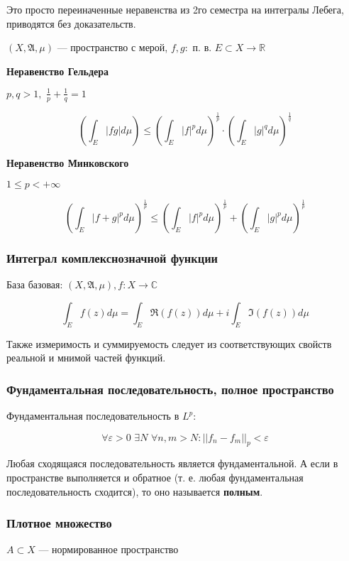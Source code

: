 \documentclass{article}
\def\dbl{\,\,}
\begin{document}
Это просто переиначенные неравенства из 2го семестра на интегралы Лебега, приводятся без доказательств.

$(X, \mathfrak{A}, \mu)$ --- пространство с мерой, $f, g: $ п. в. $E \subset X \rightarrow \mathbb{R}$

\textbf{Неравенство Гельдера}

$p, q > 1, \dbl \frac{1}{p} + \frac{1}{q} = 1$

\[\left(\int_{E} |fg| d\mu \right) \le \left(\int_{E} |f|^p d\mu\right)^{\frac{1}{p}} \cdot \left(\int_{E} |g|^q d\mu\right)^{\frac{1}{q}}\]

\textbf{Неравенство Минковского}

$1 \le p < + \infty$

\[\left(\int_{E} |f + g|^p d\mu \right)^{\frac{1}{p}} \le \left(\int_{E} |f|^p d\mu\right)^{\frac{1}{p}} + \left(\int_{E} |g|^p d\mu\right)^{\frac{1}{p}}\]

\subsubsection{Интеграл комплекснозначной функции}

База базовая: $(X, \mathfrak{A}, \mu), f: X \rightarrow \mathbb{C}$

\[\int_{E}f(z)d\mu = \int_{E}\Re(f(z))d\mu + i\int_{E}\Im(f(z))d\mu\]

Также измеримость и суммируемость следует из соответствующих свойств реальной и мнимой частей функций.

\subsubsection{Фундаментальная последовательность, полное пространство}

Фундаментальная последовательность в $L^p$:

\[\forall \varepsilon > 0 \dbl \exists N \dbl \forall n, m > N: ||f_n - f_m||_p < \varepsilon\]

Любая сходящаяся последовательность является фундаментальной. А если в пространстве выполняется и обратное (т. е. любая фундаментальная последовательность сходится), то оно называется \textbf{полным}.

\subsubsection{Плотное множество}

$A \subset X$ --- нормированное пространство
\end{document}
